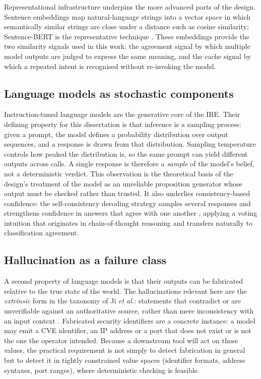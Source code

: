 Representational infrastructure underpins the more advanced parts of the
design. Sentence embeddings map natural-language strings into a vector space in
which semantically similar strings are close under a distance such as cosine
similarity; Sentence-BERT is the representative technique \parencite{reimers2019sbert}.
These embeddings provide the two similarity signals used in this work: the
agreement signal by which multiple model outputs are judged to express the same
meaning, and the cache signal by which a repeated intent is recognised without
re-invoking the model.

\subsection*{Language models as stochastic components}

Instruction-tuned language models are the generative core of the IRE. Their
defining property for this dissertation is that inference is a sampling
process: given a prompt, the model defines a probability distribution over
output sequences, and a response is drawn from that distribution. Sampling
temperature controls how peaked the distribution is, so the same prompt can
yield different outputs across calls. A single response is therefore a
\emph{sample} of the model's belief, not a deterministic verdict. This
observation is the theoretical basis of the design's treatment of the model as
an unreliable proposition generator whose output must be checked rather than
trusted. It also underlies consistency-based confidence: the
self-consistency decoding strategy samples several responses and strengthens
confidence in answers that agree with one another \parencite{wang2023selfconsistency},
applying a voting intuition that originates in chain-of-thought reasoning and
transfers naturally to classification agreement.

\subsection*{Hallucination as a failure class}

A second property of language models is that their outputs can be fabricated
relative to the true state of the world. The hallucinations relevant here are
the \emph{extrinsic} form in the taxonomy of Ji \emph{et al.}: statements that
contradict or are unverifiable against an authoritative source, rather than
mere inconsistency with an input context \parencite{ji2023hallucination}.
Fabricated security identifiers are a concrete instance: a model may emit a
CVE identifier, an IP address or a port that does not exist or is not the one
the operator intended. Because a downstream tool will act on those values, the
practical requirement is not simply to detect fabrication in general but to
detect it in tightly constrained value spaces (identifier formats, address
syntaxes, port ranges), where deterministic checking is feasible.

